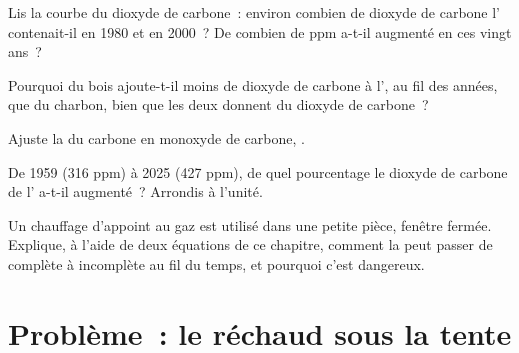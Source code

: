 \begin{exercise}[$\star\star$]\label{exo:g8:combustion-and-fuels:8}
Lis la courbe du dioxyde de carbone~: environ combien de dioxyde de
carbone l' contenait-il en 1980 et en 2000~? De combien de ppm
a-t-il augmenté en ces vingt ans~?
\end{exercise}

\begin{exercise}[$\star\star$]\label{exo:g8:combustion-and-fuels:9}
Pourquoi  du bois ajoute-t-il moins de dioxyde de carbone à l',
au fil des années, que  du charbon, bien que les deux donnent du
dioxyde de carbone~?
\end{exercise}

\begin{exercise}[$\star\star$]\label{exo:g8:combustion-and-fuels:10}
Ajuste la  du carbone en monoxyde de carbone,
. %
\end{exercise}

\begin{exercise}[$\star\star\star$]\label{exo:g8:combustion-and-fuels:11}
De 1959 (316 ppm) à 2025 (427 ppm), de quel pourcentage le dioxyde de
carbone de l' a-t-il augmenté~? Arrondis à l'unité.
\end{exercise}

\begin{exercise}[$\star\star\star$]\label{exo:g8:combustion-and-fuels:12}
Un chauffage d'appoint au gaz est utilisé dans une petite pièce, fenêtre
fermée. Explique, à l'aide de deux équations de ce chapitre, comment la
 peut passer de complète à incomplète au fil du temps, et
pourquoi c'est dangereux.
\end{exercise}

\section{Problème~: le réchaud sous la tente}

